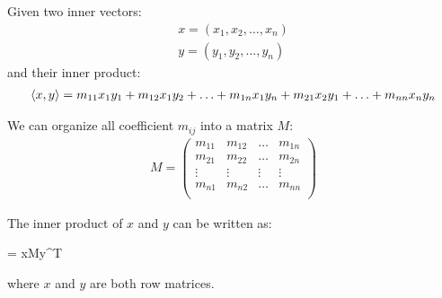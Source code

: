     \par Given two inner vectors:
      \begin{align*}
        x = (x_{1}, x_{2}, \ldots, x_{n}) \\
        y = (y_{1}, y_{2}, \ldots, y_{n})
      \end{align*}
    and their inner product:
      \begin{align*}
        \langle x, y \rangle = m_{11} x_{1}y_{1}
                     + m_{12} x_{1}y_{2}
                     + \ldots
                     + m_{1n} x_{1}y_{n}
                     + m_{21} x_{2}y_{1}
                     + \ldots
                     + m_{nn} x_{n}y_{n}
      \end{align*}
    \par We can organize all coefficient $m_{ij}$ into a matrix $M$:
    \begin{align*}
      M = \begin{pmatrix}
        m_{11} & m_{12} & \ldots & m_{1n} \\
        m_{21} & m_{22} & \ldots & m_{2n} \\
        \vdots & \vdots & \vdots & \vdots \\
        m_{n1} & m_{n2} & \ldots & m_{nn} \\
      \end{pmatrix}
    \end{align*}
    \par The inner product of $x$ and $y$ can be written as:
    \begin{eqbox}
       = xMy^{T}
    \end{eqbox}
    where $x$ and $y$ are both row matrices.


